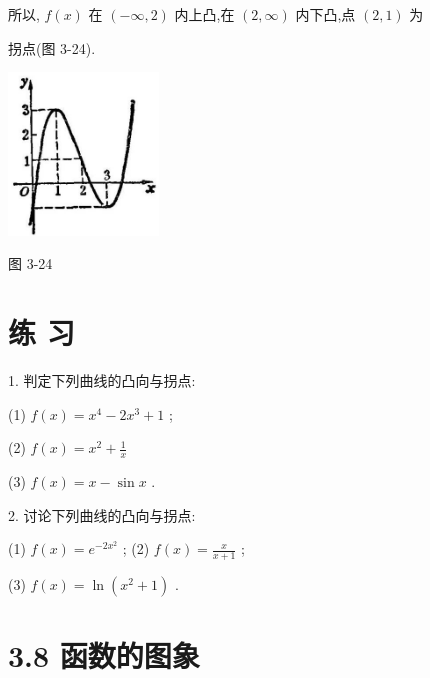 \documentclass[10pt]{article}
\begin{document}
所以, \(f\left( x\right)\) 在 \(\left( {-\infty ,2}\right)\) 内上凸,在 \(\left( {2,\infty }\right)\) 内下凸,点 \(\left( {2,1}\right)\) 为

拐点(图 3-24).

\begin{center}
\includegraphics[max width=0.3\textwidth]{images/01912c18-5c3f-733d-b775-749ba9897a9d_170_742442.jpg}
\end{center}

图 3-24

\begin{center}
\end{center}

\section*{练 习}

1. 判定下列曲线的凸向与拐点:

(1) \(f\left( x\right) = {x}^{4} - 2{x}^{3} + 1\) ;

(2) \(f\left( x\right) = {x}^{2} + \frac{1}{x}\)

(3) \(f\left( x\right) = x - \sin x\) .

2. 讨论下列曲线的凸向与拐点:

(1) \(f\left( x\right) = {e}^{-2{x}^{2}}\) ; (2) \(f\left( x\right) = \frac{x}{x + 1}\) ;

(3) \(f\left( x\right) = \ln \left( {{x}^{2} + 1}\right)\) .

\section*{3.8 函数的图象}
\end{document}

